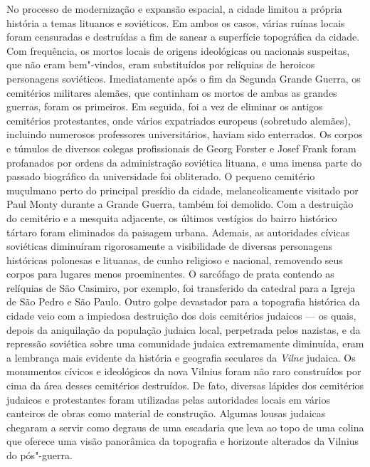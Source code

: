 No processo de modernização e expansão espacial, a cidade
limitou a própria história a temas lituanos e soviéticos. Em ambos os
casos, várias ruínas locais foram censuradas e destruídas a fim de
sanear a superfície topográfica da cidade. Com frequência, os mortos
locais de origens ideológicas ou nacionais suspeitas, que não eram
bem"-vindos, eram substituídos por relíquias de heroicos personagens
soviéticos. Imediatamente após o fim da Segunda Grande Guerra, os
cemitérios militares alemães, que continham os mortos de ambas as
grandes guerras, foram os primeiros. Em seguida, foi a vez de eliminar
os antigos cemitérios protestantes, onde vários expatriados europeus
(sobretudo alemães), incluindo numerosos professores universitários,
haviam sido enterrados. Os corpos e túmulos de diversos colegas
profissionais de Georg Forster e Josef Frank foram profanados por ordens
da administração soviética lituana, e uma imensa parte do passado
biográfico da universidade foi obliterado. O pequeno cemitério muçulmano
perto do principal presídio da cidade, melancolicamente visitado por
Paul Monty durante a Grande Guerra, também foi demolido. Com a
destruição do cemitério e a mesquita adjacente, os últimos vestígios do
bairro histórico tártaro foram eliminados da paisagem urbana. Ademais,
as autoridades cívicas soviéticas diminuíram rigorosamente a
visibilidade de diversas personagens históricas polonesas e lituanas, de
cunho religioso e nacional, removendo seus corpos para lugares menos
proeminentes. O sarcófago de prata contendo as relíquias de São
Casimiro, por exemplo, foi transferido da catedral para a Igreja de São
Pedro e São Paulo. Outro golpe devastador para a topografia histórica da
cidade veio com a impiedosa destruição dos dois cemitérios judaicos --- os
quais, depois da aniquilação da população judaica local, perpetrada
pelos nazistas, e da repressão soviética sobre uma comunidade judaica
extremamente diminuída, eram a lembrança mais evidente da história e
geografia seculares da \textit{Vilne} judaica. Os monumentos cívicos e
ideológicos da nova Vilnius foram não raro construídos por cima da área
desses cemitérios destruídos. De fato, diversas lápides dos cemitérios
judaicos e protestantes foram utilizadas pelas autoridades locais em
vários canteiros de obras como material de construção. Algumas lousas
judaicas chegaram a servir como degraus de uma escadaria que leva ao
topo de uma colina que oferece uma visão panorâmica da topografia e
horizonte alterados da Vilnius do pós"-guerra.

%

